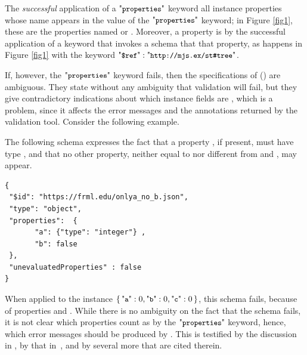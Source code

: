 \begin{toappendix}
The \emph{successful} application of a $\qprops$ keyword {\evaluates} all instance properties whose name appears
in the value of the $\qprops$ keyword; in Figure \ref{fig1}, these are the properties
named  or . Moreover, a property is {\evaluated} by the successful application of a keyword that 
invokes a schema that {\evaluates} that
property, as happens in Figure \ref{fig1} with the keyword 
$\qdref: \qkw{http://mjs.ex/st\#tree}$.

If, however, the $\qprops$ keyword fails, then the specifications of {\DTwenty} (\citep{specs2020}) are ambiguous. They state without any ambiguity that 
validation will fail, but they give contradictory indications about which instance fields are {\evaluated},
which is a problem, since it affects the error messages and the annotations returned by the validation tool.
Consider the following example.

\begin{example}\label{ex:vlds}

The following schema expresses the fact that a property , if present, must have type
, and that no other property, neither equal to  nor different from 
 and , may appear.

    \begin{querybox}{}
        \begin{lstlisting}[style=query,escapechar=Z]
{
 "$id": "https://frml.edu/onlya_no_b.json",
 "type": "object",
 "properties":  { 
       "a": {"type": "integer"} ,
       "b": false
 },
 "unevaluatedProperties" : false
}
        \end{lstlisting}
    \end{querybox}


When applied to the instance $\JObj{ \qkw{a}: 0,\qkw{b}: 0,\qkw{c}: 0 }$, this schema fails, 
because of properties  and .
While there is no ambiguity on the fact that the schema fails, it is not clear which properties 
count as {\evaluated} by the $\qprops$ keyword, 
hence,  which error messages should be produced
by {\qunProps}. This is testified by the discussion in \citeoneone, by that in~\citefiveseven, and by several more
that are cited therein.


\end{example}
\end{toappendix}
